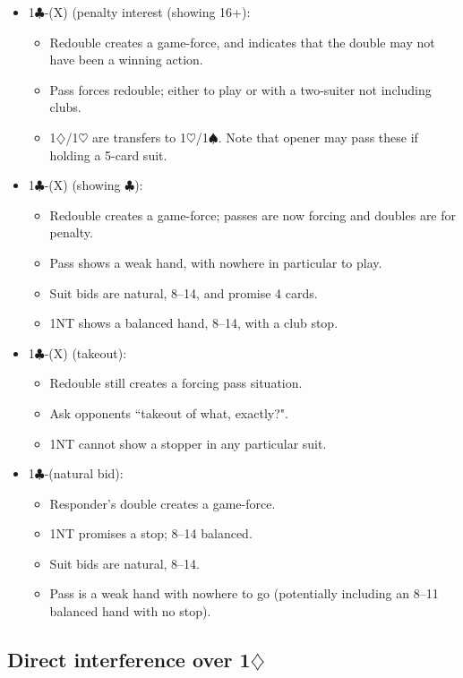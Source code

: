 \documentclass[a4paper,12pt]{article}
\begin{document}
\begin{itemize}
\item 1$\clubsuit$-(X) (penalty interest (showing 16+):
	\begin{itemize}
   \item Redouble creates a game-force, and indicates that the double may not have been 
      a winning action.
   \item Pass forces redouble; either to play or with a two-suiter not including clubs.
   \item 1$\diamondsuit$/1$\heartsuit$ are transfers to 1$\heartsuit$/1$\spadesuit$.  Note that opener may pass these if holding a 5-card 
      suit.
	\end{itemize}
\item 1$\clubsuit$-(X) (showing $\clubsuit$):
	\begin{itemize}
   \item Redouble creates a game-force; passes are now forcing and doubles are for penalty.
   \item Pass shows a weak hand, with nowhere in particular to play.
   \item Suit bids are natural, 8--14, and promise 4 cards.
   \item 1NT shows a balanced hand, 8--14, with a club stop.
	\end{itemize}
\item 1$\clubsuit$-(X) (takeout):
	\begin{itemize}
   \item Redouble still creates a forcing pass situation.
   \item Ask opponents ``takeout of what, exactly?".
   \item 1NT cannot show a stopper in any particular suit.
	\end{itemize}
\item 1$\clubsuit$-(natural bid):
	\begin{itemize}
   \item Responder's double creates a game-force.
   \item 1NT promises a stop; 8--14 balanced.
   \item Suit bids are natural, 8--14.
   \item Pass is a weak hand with nowhere to go (potentially including an 8--11 balanced hand with no stop).
	\end{itemize}
\end{itemize}

\subsection{Direct interference over 1$\diamondsuit$}
\end{document}
